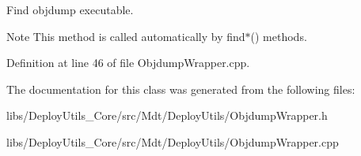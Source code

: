 Find objdump executable. 

\begin{DoxyNote}{Note}
This method is called automatically by find$\ast$() methods. 
\end{DoxyNote}


Definition at line 46 of file Objdump\+Wrapper.\+cpp.



The documentation for this class was generated from the following files\+:\begin{DoxyCompactItemize}
\item 
libs/\+Deploy\+Utils\+\_\+\+Core/src/\+Mdt/\+Deploy\+Utils/Objdump\+Wrapper.\+h\item 
libs/\+Deploy\+Utils\+\_\+\+Core/src/\+Mdt/\+Deploy\+Utils/Objdump\+Wrapper.\+cpp\end{DoxyCompactItemize}
